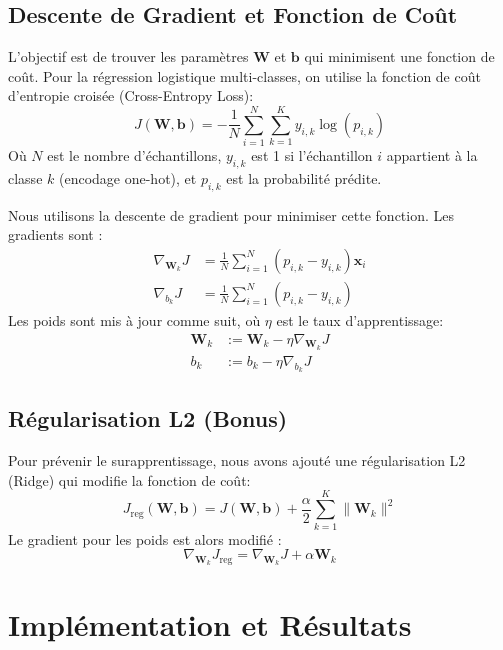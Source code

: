 \documentclass{article}
\begin{document}
\subsection{Descente de Gradient et Fonction de Coût}

L'objectif est de trouver les paramètres $\mathbf{W}$ et $\mathbf{b}$ qui
minimisent une fonction de coût. Pour la régression logistique multi-classes,
on utilise la fonction de coût d'entropie croisée (Cross-Entropy Loss):
\begin{equation}
    J(\mathbf{W}, \mathbf{b}) = - \frac{1}{N} \sum_{i=1}^{N} \sum_{k=1}^{K} y_{i,k} \log(p_{i,k})
\end{equation}
Où $N$ est le nombre d'échantillons, $y_{i,k}$ est 1 si l'échantillon $i$ appartient à la classe $k$ (encodage one-hot), et $p_{i,k}$ est la probabilité prédite.

Nous utilisons la descente de gradient pour minimiser cette fonction. Les
gradients sont :
\begin{align}
    \nabla_{\mathbf{W}_k} J & = \frac{1}{N} \sum_{i=1}^{N} (p_{i,k} - y_{i,k}) \mathbf{x}_i \\
    \nabla_{b_k} J          & = \frac{1}{N} \sum_{i=1}^{N} (p_{i,k} - y_{i,k})
\end{align}
Les poids sont mis à jour comme suit, où $\eta$ est le taux d'apprentissage:
\begin{align}
    \mathbf{W}_k & := \mathbf{W}_k - \eta \nabla_{\mathbf{W}_k} J \\
    b_k          & := b_k - \eta \nabla_{b_k} J
\end{align}

\subsection{Régularisation L2 (Bonus)}
Pour prévenir le surapprentissage, nous avons ajouté une régularisation L2
(Ridge) qui modifie la fonction de coût:
\begin{equation}
    J_{\text{reg}}(\mathbf{W}, \mathbf{b}) = J(\mathbf{W}, \mathbf{b}) + \frac{\alpha}{2} \sum_{k=1}^{K} \|\mathbf{W}_k\|^2
\end{equation}
Le gradient pour les poids est alors modifié :
\begin{equation}
    \nabla_{\mathbf{W}_k} J_{\text{reg}} = \nabla_{\mathbf{W}_k} J + \alpha \mathbf{W}_k
\end{equation}

\section{Implémentation et Résultats}
\end{document}
